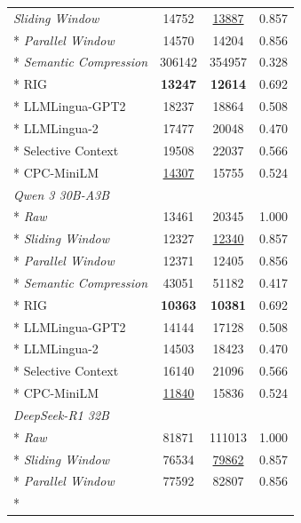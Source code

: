 {\begin{longtable}{lcc|c}
\textit{Sliding Window}        & 14752             & \underline{13887} & 0.857 \\*
\textit{Parallel Window}       & 14570             & 14204             & 0.856 \\*
\textit{Semantic Compression}  & 306142            & 354957            & 0.328 \\*
RIG                            & \textbf{13247}    & \textbf{12614}    & 0.692 \\*
LLMLingua-GPT2                 & 18237             & 18864             & 0.508 \\*
LLMLingua-2                    & 17477             & 20048             & 0.470 \\*
Selective Context              & 19508             & 22037             & 0.566 \\*
CPC-MiniLM                     & \underline{14307} & 15755             & 0.524 \\
\midrule
\multicolumn{4}{l}{\textit{Qwen 3 30B-A3B}} \\*
\textit{Raw}                   & 13461             & 20345             & 1.000 \\*
\textit{Sliding Window}        & 12327             & \underline{12340} & 0.857 \\*
\textit{Parallel Window}       & 12371             & 12405             & 0.856 \\*
\textit{Semantic Compression}  & 43051             & 51182             & 0.417 \\*
RIG                            & \textbf{10363}    & \textbf{10381}    & 0.692 \\*
LLMLingua-GPT2                 & 14144             & 17128             & 0.508 \\*
LLMLingua-2                    & 14503             & 18423             & 0.470 \\*
Selective Context              & 16140             & 21096             & 0.566 \\*
CPC-MiniLM                     & \underline{11840} & 15836             & 0.524 \\
\midrule
\multicolumn{4}{l}{\textit{DeepSeek-R1 32B}} \\*
\textit{Raw}                   & 81871             & 111013            & 1.000 \\*
\textit{Sliding Window}        & 76534             & \underline{79862} & 0.857 \\*
\textit{Parallel Window}       & 77592             & 82807             & 0.856 \\*

\end{longtable}}

